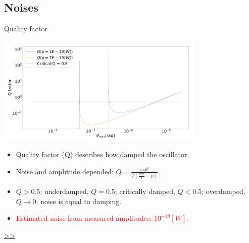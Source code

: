 \documentclass{beamer}
\begin{document}
\subsection{Noises}

\begin{frame}{\hypertarget{frame:Quality factor}{Quality factor}}
	\begin{center}		
		\includegraphics[width=0.75\textwidth,keepaspectratio]{Q factor.png}
	\end{center}
	\begin{itemize}	
		\item Quality factor (Q) describes how damped the oscillator.
		\item Noise and amplitude depended: $Q =  \frac{\pi\kappa\theta^2}{T(\frac{\theta\pi\tau}{T} -p)} $.
		\item $Q>0.5$; underdamped, $Q=0.5$; critically damped, $Q<0.5$; overdamped, $Q\rightarrow 0$; noise is equal to damping. 
		\item \textcolor{red}{Estimated noise from measured amplitudes; $10^{-19}[W]$.} 
	\end{itemize}
	\hyperlink{frame:Quality factor 1}{>>} 
\end{frame}
\end{document}
